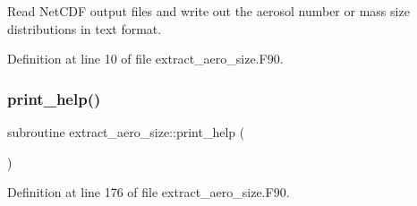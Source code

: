 Read Net\+C\+DF output files and write out the aerosol number or mass size distributions in text format. 



Definition at line 10 of file extract\+\_\+aero\+\_\+size.\+F90.

\mbox{\label{extract__aero__size_8_f90_a81d35e7230d75e333829a2fb36cbafc0}} 
\subsubsection{\texorpdfstring{print\+\_\+help()}{print\_help()}}
{\footnotesize\ttfamily subroutine extract\+\_\+aero\+\_\+size\+::print\+\_\+help (\begin{DoxyParamCaption}{ }\end{DoxyParamCaption})}



Definition at line 176 of file extract\+\_\+aero\+\_\+size.\+F90.

